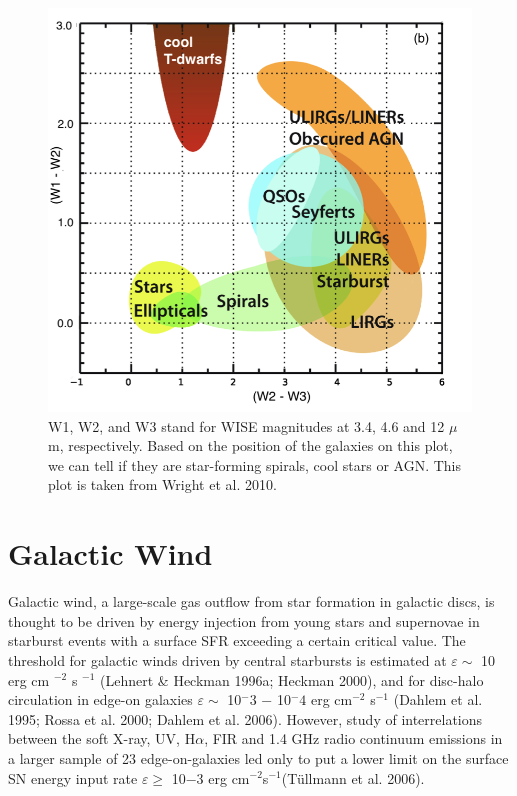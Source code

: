 \begin{figure}
    \centering
    \includegraphics{Notes_Images/wise_color_color.png}
    \caption{W1, W2, and W3 stand for WISE magnitudes at 3.4, 4.6 and 12 $\mu$m, respectively. Based on the position of the galaxies on this plot, we can tell if they are star-forming spirals, cool stars or AGN. This plot is taken from Wright et al. 2010.  }
    \label{fig:enter-label}
\end{figure}


\section{Galactic Wind}

Galactic wind, a large-scale gas outflow from star formation in galactic discs, is thought to be driven by energy injection from young stars and supernovae in starburst events with a surface SFR exceeding a certain critical value. 
 The threshold for galactic winds driven by central starbursts is estimated at $ \varepsilon  \sim $ 10 erg cm $^{−2}$ s $^{−1}$ (Lehnert \& Heckman 1996a; Heckman 2000),  and for disc-halo circulation in edge-on galaxies $\varepsilon \sim$  10$^−3$ − 10$^−4$ erg cm$^{−2}$ s$^{−1}$ (Dahlem et al. 1995; Rossa et al. 2000; Dahlem et al. 2006). However, study of interrelations between the soft X-ray, UV, H$\alpha$, FIR and 1.4 GHz radio continuum emissions in a larger sample of 23 edge-on-galaxies led only to put a lower limit on the surface SN energy input rate $\varepsilon \geq$  10−3 erg cm$^{−2}$s$^{−1}$(Tüllmann et al. 2006).


